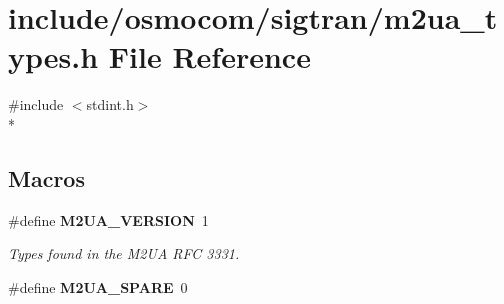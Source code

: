 \section{include/osmocom/sigtran/m2ua\+\_\+types.h File Reference}
\label{m2ua__types_8h}
{\ttfamily \#include $<$stdint.\+h$>$}\\*
\subsection*{Macros}
\begin{DoxyCompactItemize}
\item 
\#define {\bf M2\+U\+A\+\_\+\+V\+E\+R\+S\+I\+ON}~1
\begin{DoxyCompactList}\small\item\em Types found in the M2\+UA R\+FC 3331. \end{DoxyCompactList}\item 
\#define {\bf M2\+U\+A\+\_\+\+S\+P\+A\+RE}~0
\end{DoxyCompactItemize}
